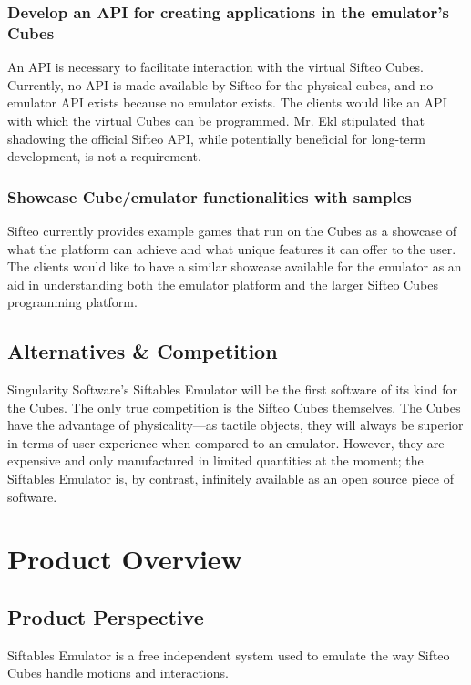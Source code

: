 \documentclass[12pt]{article}
\begin{document}
                          \subsubsection{Develop an API for creating applications in the emulator’s Cubes}
                          An \gls{API} is necessary to facilitate interaction with the virtual Sifteo Cubes. Currently, no API is made available by Sifteo for the physical cubes, and no emulator API exists because no emulator exists. The clients would like an API with which the virtual Cubes can be programmed. Mr. Ekl stipulated that shadowing the official Sifteo API, while potentially beneficial for long-term development, is not a requirement.

                          \subsubsection{Showcase Cube/emulator functionalities with samples}
                          Sifteo currently provides example games that run on the Cubes as a showcase of what the platform can achieve and what unique features it can offer to the user. The clients would like to have a similar showcase available for the emulator as an aid in understanding both the emulator platform and the larger Sifteo Cubes programming platform.

              \subsection{Alternatives \& Competition}
              Singularity Software's Siftables Emulator will be the first software of its kind for the Cubes. The only true competition is the Sifteo Cubes themselves. The Cubes have the advantage of physicality---as tactile objects, they will always be superior in terms of user experience when compared to an emulator. However, they are expensive and only manufactured in limited quantities at the moment; the Siftables Emulator is, by contrast, infinitely available as an open source piece of software.

\section{Product Overview}

              \subsection{Product Perspective}
              Siftables Emulator is a free independent system used to emulate the way Sifteo Cubes handle motions and interactions.
\end{document}
